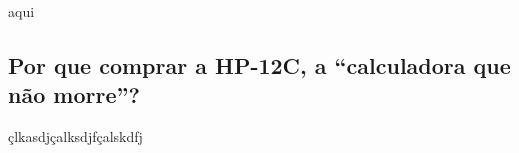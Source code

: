 \documentclass[pdftex,a4paper,12pt,brazil]{article} %
\begin{document}
aqui

\subsection{Por que comprar a HP-12C, a ``calculadora que não morre''?}
\label{por-que-comprar}

çlkasdjçalksdjfçalskdfj


%


\end{document}

